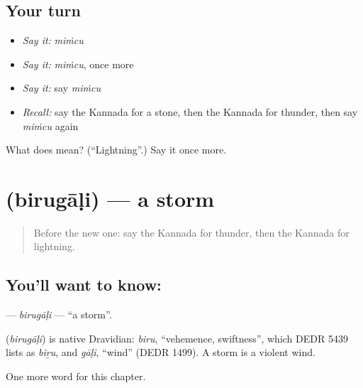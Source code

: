 \subsection*{Your turn}
\begin{itemize}
\raggedright
  \item \emph{Say it:} \emph{miṁcu}
  \item \emph{Say it:} \emph{miṁcu}, once more
  \item \emph{Say it:} say \emph{miṁcu}
  \item \emph{Recall:} say the Kannada for a stone, then the Kannada for thunder, then say \emph{miṁcu} again
\end{itemize}

\begin{tcolorbox}[breakable,colback=teal!4,colframe=teal!35!black,title={Before you move on}]
What does  mean? (\textquotedblleft{}Lightning\textquotedblright{}.) Say it once more.
\end{tcolorbox}
\section[\texorpdfstring{\kn{ಬಿರುಗಾಳಿ} (birugāḷi)}{ಬಿರುಗಾಳಿ (birugāḷi)}]{ (birugāḷi) — a storm}

\label{lesson:KA-C128-birugali}



\begin{quote}
Before the new one: say the Kannada for thunder, then the Kannada for lightning.
\end{quote}

\subsection*{You'll want to know: }
\textbf{} — \emph{birugāḷi} — \textquotedblleft{}a storm\textquotedblright{}.

\begin{cousinweb}
\textbf{} (\emph{birugāḷi}) is native Dravidian: \emph{biru}, \textquotedblleft{}vehemence, swiftness\textquotedblright{}, which DEDR 5439 lists as \emph{biṟu}, and \emph{gāḷi}, \textquotedblleft{}wind\textquotedblright{} (DEDR 1499). A storm is a violent wind.
\end{cousinweb}

\begin{grammarlens}[title={What you've built}]
One more word for this chapter.
\end{grammarlens}

